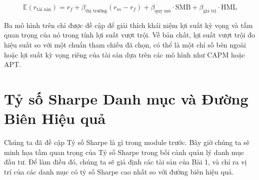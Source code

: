 $$
\mathbb{E}(r_{\text{tài sản}}) = r_{f} + \beta_{\text{thị trường}} (r_{m} - r_{f}) + \beta_{\text{quy mô}} \cdot \text{SMB} + \beta_{\text{giá trị}} \cdot \text{HML}
$$

Ba mô hình trên chỉ được đề cập để giải thích khái niệm lợi suất kỳ vọng và tầm quan trọng của nó trong tính lợi suất vượt trội. Về bản chất, lợi suất vượt trội đo hiệu suất so với một chuẩn tham chiếu đã chọn, có thể là một chỉ số bên ngoài hoặc lợi suất kỳ vọng riêng của tài sản dựa trên các mô hình như CAPM hoặc APT.

\section{Tỷ số Sharpe Danh mục và Đường Biên Hiệu quả}

Chúng ta đã đề cập Tỷ số Sharpe là gì trong module trước. Bây giờ chúng ta sẽ minh họa tầm quan trọng của Tỷ số Sharpe trong bối cảnh quản lý danh mục đầu tư. Để làm điều đó, chúng ta sẽ giả định các tài sản của Bài 1, và chỉ ra vị trí của các danh mục có tỷ số Sharpe cao nhất so với đường biên hiệu quả.

